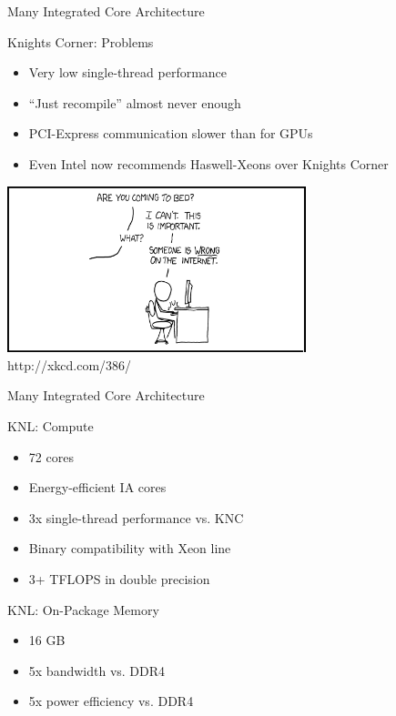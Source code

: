 \begin{frame}{Many Integrated Core Architecture}
 
 \begin{block}{Knights Corner: Problems}
  \begin{itemize}
   \item Very low single-thread performance
   \item ``Just recompile'' almost never enough
   \item PCI-Express communication slower than for GPUs
   \item Even Intel now recommends Haswell-Xeons over Knights Corner
  \end{itemize}
 \end{block}
 
 \begin{center}
  \includegraphics[width=0.65\textwidth]{figures/xkcd-someone-wrong} \\
  {\scriptsize http://xkcd.com/386/}
 \end{center}

\end{frame}



\begin{frame}{Many Integrated Core Architecture}
 
 \begin{block}{KNL: Compute}
  \begin{itemize}
   \item 72 cores
   \item Energy-efficient IA cores
   \item 3x single-thread performance vs. KNC
   \item Binary compatibility with Xeon line
   \item 3+ TFLOPS in double precision
  \end{itemize}
 \end{block}

 \begin{block}{KNL: On-Package Memory}
  \begin{itemize}
   \item 16 GB
   \item 5x bandwidth vs. DDR4
   \item 5x power efficiency vs. DDR4
  \end{itemize}
 \end{block}
 
\end{frame}



